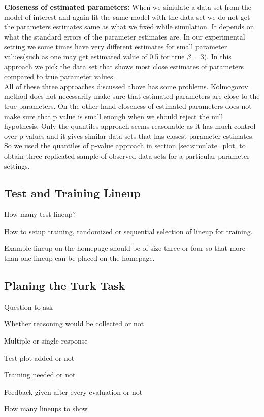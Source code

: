 \documentclass[11pt]{article}
\begin{document}
{\bf Closeness of estimated parameters:} When we simulate a data set from the model of interest and again fit the same model with the data set we do not get the parameters estimates same as what we fixed while simulation. It depends on what the standard errors of the parameter estimates are. In our experimental setting we some times have very different estimates for small parameter values(such as one may get estimated value of 0.5 for true $\beta=3$). In this approach we pick the data set that shows most close estimates of parameters compared to true parameter values.\\

All of these three approaches discussed above has some problems. Kolmogorov method does not necessarily make sure that estimated parameters are close to the true parameters. On the other hand closeness of estimated parameters does not make sure that p value is small enough when we should reject the null hypothesis. Only the quantiles approach seems reasonable as it has much control over p-values and it gives similar data sets that has closest parameter estimates. So we used the quantiles of p-value approach in section \ref{sec:simulate_plot} to obtain three replicated sample of observed data sets for a particular parameter settings.\\

\subsection{Test and Training Lineup} How many test lineup?

How to setup training, randomized or sequential selection of lineup for training.

Example lineup on the homepage should be of size three or four so that more than one lineup can be placed on the homepage.

\subsection{Planing the Turk Task}
Question to ask

Whether reasoning would be collected or not

Multiple or single response

Test plot added or not

Training needed or not

Feedback given after every evaluation or not

How many lineups to show
\end{document}
